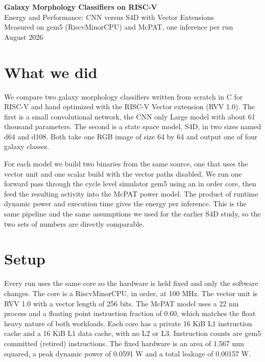 \documentclass[11pt]{article}
\begin{document}
\begin{center}
{\LARGE\bfseries\color{navy} Galaxy Morphology Classifiers on RISC-V}\\[4pt]
{\large Energy and Performance: CNN versus S4D with Vector Extensions}\\[6pt]
{\normalsize Measured on gem5 (RiscvMinorCPU) and McPAT, one inference per run}\\[2pt]
{\small August 2026}
\end{center}

\vspace{0.6em}

\section{What we did}

We compare two galaxy morphology classifiers written from scratch in C for RISC-V and hand optimized with the RISC-V Vector extension (RVV 1.0). The first is a small convolutional network, the CNN only Large model with about 61 thousand parameters. The second is a state space model, S4D, in two sizes named d64 and d108. Both take one RGB image of size 64 by 64 and output one of four galaxy classes.

For each model we build two binaries from the same source, one that uses the vector unit and one scalar build with the vector paths disabled. We run one forward pass through the cycle level simulator gem5 using an in order core, then feed the resulting activity into the McPAT power model. The product of runtime dynamic power and execution time gives the energy per inference. This is the same pipeline and the same assumptions we used for the earlier S4D study, so the two sets of numbers are directly comparable.

\section{Setup}

Every run uses the same core so the hardware is held fixed and only the software changes. The core is a RiscvMinorCPU, in order, at 100 MHz. The vector unit is RVV 1.0 with a vector length of 256 bits. The McPAT model uses a 22 nm process and a floating point instruction fraction of 0.60, which matches the float heavy nature of both workloads. Each core has a private 16 KiB L1 instruction cache and a 16 KiB L1 data cache, with no L2 or L3. Instruction counts are gem5 committed (retired) instructions. The fixed hardware is an area of 1.567 mm squared, a peak dynamic power of 0.0591 W and a total leakage of 0.00157 W.
\end{document}
